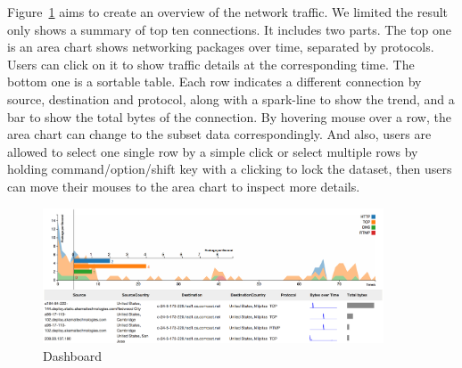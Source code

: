 \documentclass[paper=a4, fontsize=11pt]{report} %
\begin{document}
\begin{description}[style=nextline]
    \item[\href{http://sjengle.cs.usfca.edu/cs690-sonicwall/public/demo/}{Dashboard}]
    Figure~\ref{fig:dashboard} aims to create an overview of the network traffic.
    We limited the result only shows a summary of top ten connections.
    It includes two parts.
    The top one is an area chart shows networking packages over time, separated by protocols.
    Users can click on it to show traffic details at the corresponding time.
    The bottom one is a sortable table. Each row indicates a different connection by source, destination and protocol, along with a spark-line to show the trend, and a bar to show the total bytes of the connection.
    By hovering mouse over a row, the area chart can change to the subset data correspondingly.
    And also, users are allowed to select one single row by a simple click or select multiple rows by holding command/option/shift key with a clicking to lock the dataset, then users can move their mouses to the area chart to inspect more details.
    \begin{figure}[H]
        \begin{center}
            \includegraphics[width=0.9\textwidth]{dashboard.png}
        \end{center}
        \caption{Dashboard}\label{fig:dashboard}
    \end{figure}


\end{description}
\end{document}
